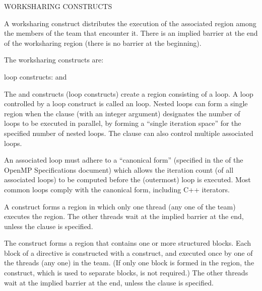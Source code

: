 \bigskip
WORKSHARING CONSTRUCTS

A worksharing construct distributes the execution of the associated region
among the members of the team that encounter it.  There is an
implied barrier at the end of the worksharing region
(there is no barrier at the beginning). 

\newpage
The worksharing constructs are:

\begin{compactitem}

\item loop constructs: { and  }
\item {}
\item {}
\item {}

\end{compactitem}

The  and  constructs (loop constructs) create a region 
consisting of a loop.  A loop controlled by a loop construct is called 
an  loop.  Nested loops can form a single region when the 
 clause (with an integer argument) designates the number of 
 loops to be executed in parallel, by forming a 
``single iteration space'' for the specified number of nested loops.
The  clause can also control multiple associated loops.

An associated loop must adhere to a ``canonical form'' (specified in the
 of the OpenMP Specifications document) which allows the 
iteration count (of all associated loops) to be computed before the 
(outermost) loop is executed. %
Most common loops comply with the canonical form, including C++ iterators.

A  construct forms a region in which only one thread (any one 
of the team) executes the region. 
The other threads wait at the implied 
barrier at the end, unless the  clause is specified.

The  construct forms a region that contains one or more 
structured blocks.  Each block of a  directive is 
constructed with a  construct, and executed once by 
one of the threads (any one) in the team.  (If only one block is 
formed in the region, the  construct, which is used to
separate blocks, is not required.)
The other threads wait at the implied 
barrier at the end, unless the  clause is specified.


